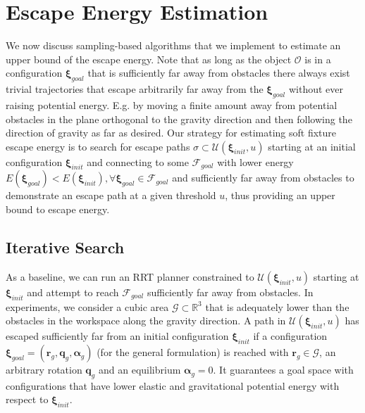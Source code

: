 \documentclass[conference]{IEEEtran}
\newcommand{\bxi}{\boldsymbol{\xi}}
\begin{document}
\section{Escape Energy Estimation}
We now discuss sampling-based algorithms that we implement to estimate an upper bound of the escape energy.
Note that as long as the object $\mathcal{O}$ is in a configuration $\bxi_{goal}$ that is sufficiently far away from obstacles there always exist trivial trajectories that escape arbitrarily far away from the $\bxi_{goal}$ without ever raising potential energy. E.g. by moving a finite amount away from potential obstacles in the plane orthogonal to the gravity direction and then following the direction of gravity as far as desired.
Our strategy for estimating soft fixture escape energy is to search for escape paths $\sigma\subset \mathcal{U}(\bxi_{init}, u)$ starting at an initial configuration $\bxi_{init}$ and connecting to some $\mathcal{F}_{goal}$ with lower energy $E(\bxi_{goal}) < E(\bxi_{init}), \forall \bxi_{goal} \in \mathcal{F}_{goal}$ and sufficiently far away from obstacles to demonstrate an escape path at a given threshold $u$, thus providing an upper bound to escape energy. 

\subsection{Iterative Search}
As a baseline, we can run an RRT \cite{b15} planner constrained to $\mathcal{U}(\bxi_{init}, u)$ starting at $\bxi_{init}$ and attempt to reach $\mathcal{F}_{goal}$ sufficiently far away from obstacles. 
In experiments, we consider a cubic area $\mathcal{G} \subset \mathbb{R}^3$ that is adequately lower than the obstacles in the workspace along the gravity direction.
A path in $\mathcal{U}(\bxi_{init}, u)$ has escaped sufficiently far from an initial configuration $\bxi_{init}$ if a configuration $\bxi_{goal}=(\boldsymbol{r}_g, \boldsymbol{q}_g, \boldsymbol{\alpha}_g)$ (for the general formulation) is reached with $\boldsymbol{r}_g \in \mathcal{G}$, an arbitrary rotation $\boldsymbol{q}_g$ and an equilibrium $\boldsymbol{\alpha}_g=0$.
It guarantees a goal space with configurations that have lower elastic and gravitational potential energy with respect to $\bxi_{init}$. 
\end{document}
